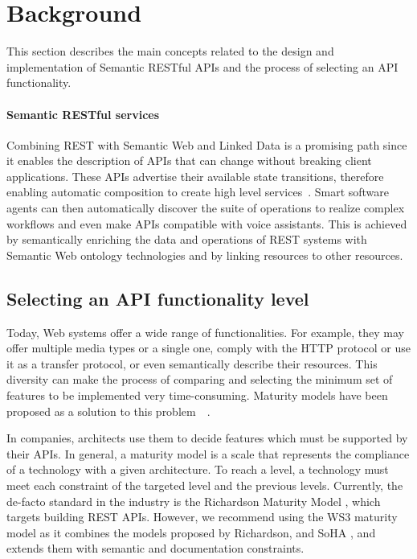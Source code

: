 \section{Background} \label{sec:background}

\vspace*{-0.2cm}

This section describes the main concepts related to the design and implementation of Semantic RESTful APIs and the process of selecting an API functionality.

\paragraph{Semantic RESTful services}
Combining REST with Semantic Web and Linked Data is a promising path since it enables the description of APIs that can change without breaking client applications. These APIs advertise their available state transitions, therefore enabling automatic composition to create high level services~\cite{alarcon2015rest}. Smart software agents can then automatically discover the suite of operations to realize complex workflows and even make APIs compatible with voice assistants. This is achieved by semantically enriching the data and operations of REST systems with Semantic Web ontology technologies and by linking resources to other resources.

\subsection{Selecting an API functionality level}\label{sec:maturityLevel}

Today, Web systems offer a wide range of functionalities. For example, they may offer multiple media types or a single one, comply with the HTTP protocol or use it as a transfer protocol, or even semantically describe their resources. This diversity can make the process of comparing and selecting the minimum set of features to be implemented very time-consuming. Maturity models have been proposed as a solution to this problem~\cite{paulk1993capability}~\cite{7195633}.

In companies, architects use them to decide features which must be supported by their APIs. In general, a maturity model is a scale that represents the compliance of a technology with a given architecture. To reach a level, a technology must meet each constraint of the targeted level and the previous levels.
Currently, the de-facto standard in the industry is the Richardson Maturity Model \cite{RichardsonMaturityModel}, which targets building REST APIs. However, we recommend using the WS3 maturity model \cite{7195633} as it combines the models proposed by Richardson, and SoHA \cite{SoHA}, and extends them with semantic and documentation constraints.


